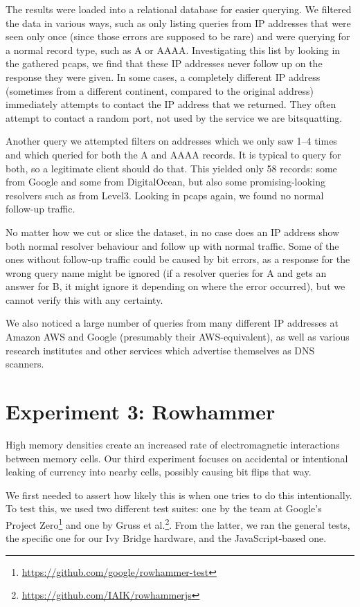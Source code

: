 \documentclass[conference]{IEEEtran}
\begin{document}
The results were loaded into a relational database for easier querying. We
filtered the data in various ways, such as only listing queries from IP
addresses that were seen only once (since those errors are supposed to be rare)
and were querying for a normal record type, such as A or AAAA. Investigating
this list by looking in the gathered pcaps, we find that these IP addresses
never follow up on the response they were given. In some cases, a completely
different IP address (sometimes from a different continent, compared to the
original address) immediately attempts to contact the IP address that we
returned. They often attempt to contact a random port, not used by the service
we are bitsquatting.

Another query we attempted filters on addresses which we only saw 1--4 times
and which queried for both the A and AAAA records. It is typical to query for
both, so a legitimate client should do that. This yielded only 58 records: some
from Google and some from DigitalOcean, but also some promising-looking
resolvers such as from Level3. Looking in pcaps again, we found no normal
follow-up traffic.

No matter how we cut or slice the dataset, in no case does an IP address show
both normal resolver behaviour and follow up with normal traffic. Some of the
ones without follow-up traffic could be caused by bit errors, as a response for
the wrong query name might be ignored (if a resolver queries for A and gets an
answer for B, it might ignore it depending on where the error occurred), but
we cannot verify this with any certainty.

We also noticed a large number of queries from many different IP addresses at
Amazon AWS and Google (presumably their AWS-equivalent), as well as various
research institutes and other services which advertise themselves as DNS
scanners.

\section{Experiment 3: Rowhammer}

High memory densities create an increased rate of electromagnetic interactions
between memory cells\cite{kim2014flipping}. Our third experiment focuses on
accidental or intentional leaking of currency into nearby cells, possibly
causing bit flips that way.

We first needed to assert how likely this is when one tries to do this
intentionally. To test this, we used two different test suites: one by the team
at Google's Project
Zero\footnote{\url{https://github.com/google/rowhammer-test}} and one by Gruss
et
al.\cite{gruss2016rowhammer}\footnote{\url{https://github.com/IAIK/rowhammerjs}}.
From the latter, we ran the general tests, the specific one for our Ivy Bridge
hardware, and the JavaScript-based one.
\end{document}
